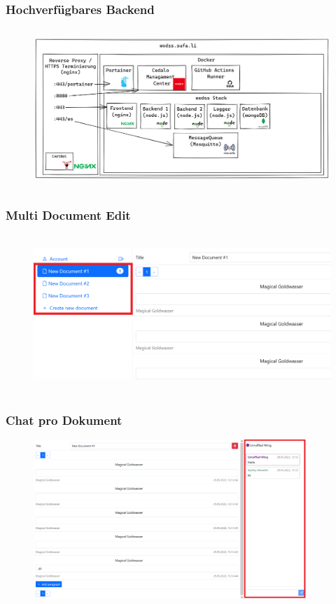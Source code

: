 \begin{frame}
    \frametitle{Hochverfügbares Backend}
    \begin{figure}
        \centering
        \includegraphics[height=6cm]{media/Physical_BigPicture_wodss}
    \end{figure}
\end{frame}
\begin{frame}
    \frametitle{Multi Document Edit}
    \begin{figure}
        \centering
        \includegraphics[height=6cm]{media/multiDocuemntEdit}
    \end{figure}
\end{frame}

\begin{frame}
    \frametitle{Chat pro Dokument}
    \begin{figure}
        \centering
        \includegraphics[height=6cm]{media/DocumentChat}
    \end{figure}
\end{frame}
